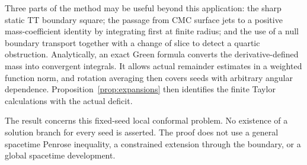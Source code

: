 Three parts of the method may be useful beyond this application:
the sharp static TT boundary square; the passage from CMC surface
jets to a positive mass-coefficient identity by integrating first
at finite radius; and the use of a null boundary transport together
with a change of slice to detect a quartic obstruction. Analytically,
an exact Green formula converts the derivative-defined mass into
convergent integrals. It allows actual remainder estimates in a
weighted function norm, and rotation averaging then covers seeds
with arbitrary angular dependence. Proposition~\ref{prop:expansions}
then identifies the finite Taylor calculations with the actual deficit.

The result concerns this fixed-seed local conformal problem.
No existence of a solution branch for every seed is asserted.
The proof does not use a general spacetime Penrose inequality,
a constrained extension through the boundary, or a global
spacetime development.
